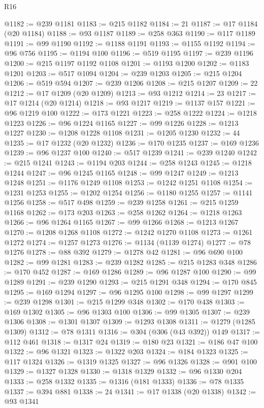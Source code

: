 \begin{lexlean}{R16}
\begin{coremodule}
@1182 := @239 @1181
@1183 := @215 @1182
@1184 := 21
@1187 := @17 @1184 (@20 @1184)
@1188 := @93 @1187
@1189 := @258 @363
@1190 := @117 @1189
@1191 := @99 @1190
@1192 := @1188 @1191
@1193 := @1155 @1192
@1194 := @96 @756
@1195 := @1194 @100
@1196 := @519 @1195
@1197 := @239 @1196
@1200 := @215 @1197 @1192 @1108
@1201 := @1193 @1200
@1202 := @1183 @1201
@1203 := @517 @1094
@1204 := @239 @1203
@1205 := @215 @1204
@1206 := @519 @594
@1207 := @239 @1206
@1208 := @215 @1207
@1209 := 22
@1212 := @17 @1209 (@20 @1209)
@1213 := @93 @1212
@1214 := 23
@1217 := @17 @1214 (@20 @1214)
@1218 := @93 @1217
@1219 := @1137 @157
@1221 := @96 @1219 @100
@1222 := @173 @1221
@1223 := @258 @1222
@1224 := @1218 @1223
@1226 := @96 @1224 @1165
@1227 := @99 @1226
@1228 := @1213 @1227
@1230 := @1208 @1228 @1108
@1231 := @1205 @1230
@1232 := 44
@1235 := @17 @1232 (@20 @1232)
@1236 := @170 @1235
@1237 := @169 @1236
@1239 := @96 @1237 @100
@1240 := @517 @1239
@1241 := @239 @1240
@1242 := @215 @1241
@1243 := @1194 @203
@1244 := @258 @1243
@1245 := @1218 @1244
@1247 := @96 @1245 @1165
@1248 := @99 @1247
@1249 := @1213 @1248
@1251 := @1176 @1249 @1108
@1253 := @1242 @1251 @1108
@1254 := @1231 @1253
@1255 := @1202 @1254
@1256 := @1180 @1255
@1257 := @1141 @1256
@1258 := @517 @498
@1259 := @239 @1258
@1261 := @215 @1259 @1168
@1262 := @173 @203
@1263 := @258 @1262
@1264 := @1218 @1263
@1266 := @96 @1264 @1165
@1267 := @99 @1266
@1268 := @1213 @1267
@1270 := @1208 @1268 @1108
@1272 := @1242 @1270 @1108
@1273 := @1261 @1272
@1274 := @1257 @1273
@1276 := @1134 (@1139 @1274)
@1277 := @78 @1276
@1278 := @88 @392
@1279 := @1278 @42
@1281 := @96 @690 @100
@1282 := @99 @1281
@1283 := @239 @1282
@1285 := @215 @1283 @348
@1286 := @170 @452
@1287 := @169 @1286
@1289 := @96 @1287 @100
@1290 := @99 @1289
@1291 := @239 @1290
@1293 := @215 @1291 @348
@1294 := @170 @845
@1295 := @169 @1294
@1297 := @96 @1295 @100
@1298 := @99 @1297
@1299 := @239 @1298
@1301 := @215 @1299 @348
@1302 := @170 @438
@1303 := @169 @1302
@1305 := @96 @1303 @100
@1306 := @99 @1305
@1307 := @239 @1306
@1308 := @1301 @1307
@1309 := @1293 @1308
@1311 := @1279 (@1285 @1309)
@1312 := @78 @1311
@1316 := @304 (@306 (@43 @392)) @149
@1317 := @112 @461
@1318 := @1317 @24
@1319 := @180 @23
@1321 := @186 @47 @100
@1322 := @96 @1321
@1323 := @1322 @203
@1324 := @184 @1323
@1325 := @117 @1324
@1326 := @1319 @1325
@1327 := @96 @1326
@1328 := @901 @100
@1329 := @1327 @1328
@1330 := @1318 @1329
@1332 := @96 @1330 @204
@1333 := @258 @1332
@1335 := @1316 (@181 @1333)
@1336 := @78 @1335
@1337 := @394 @881
@1338 := 24
@1341 := @17 @1338 (@20 @1338)
@1342 := @93 @1341

\end{coremodule}
\end{lexlean}
